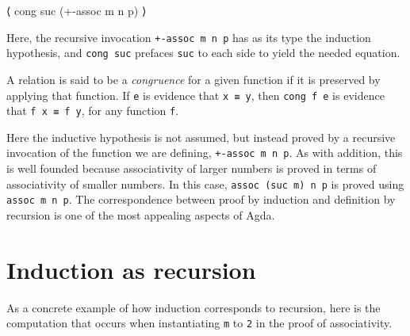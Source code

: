 \begin{myDisplay}
⟨ cong suc (+-assoc m n p) ⟩
\end{myDisplay}

Here, the recursive invocation \texttt{+-assoc\ m\ n\ p} has as its type
the induction hypothesis, and \texttt{cong\ suc} prefaces \texttt{suc}
to each side to yield the needed equation.

A relation is said to be a \emph{congruence} for a given function if it
is preserved by applying that function. If \texttt{e} is evidence that
\texttt{x\ ≡\ y}, then \texttt{cong\ f\ e} is evidence that
\texttt{f\ x\ ≡\ f\ y}, for any function \texttt{f}.

Here the inductive hypothesis is not assumed, but instead proved by a
recursive invocation of the function we are defining,
\texttt{+-assoc\ m\ n\ p}. As with addition, this is well founded
because associativity of larger numbers is proved in terms of
associativity of smaller numbers. In this case,
\texttt{assoc\ (suc\ m)\ n\ p} is proved using \texttt{assoc\ m\ n\ p}.
The correspondence between proof by induction and definition by
recursion is one of the most appealing aspects of Agda.

\hypertarget{induction-as-recursion}{%
\section{Induction as recursion}\label{induction-as-recursion}}

As a concrete example of how induction corresponds to recursion, here is
the computation that occurs when instantiating \texttt{m} to \texttt{2}
in the proof of associativity.

